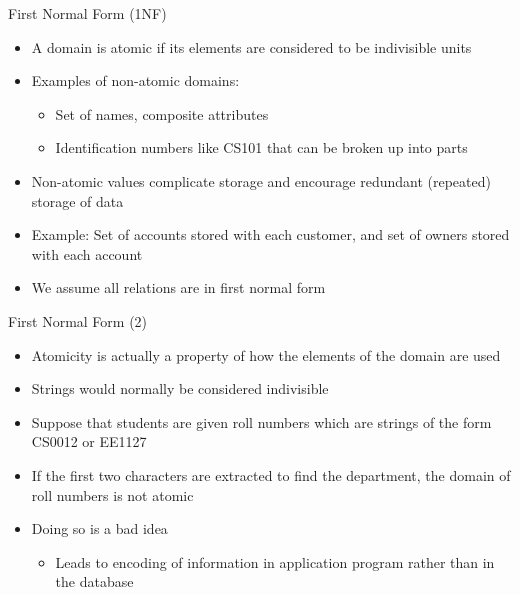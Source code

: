 \documentclass[aspectratio=169, xcolor=dvipsnames]{beamer}
\begin{document}
\begin{frame}{First Normal Form (1NF)}
    \begin{itemize}[<+->]
        \item A domain is atomic if its elements are considered to be indivisible units
        \item Examples of non-atomic domains:
        \begin{itemize}
            \item[$\triangleright$] Set of names, composite attributes
            \item[$\triangleright$] Identification numbers like CS101 that can be broken up into parts
        \end{itemize}
    \end{itemize}
    \begin{itemize}[<+(4)->]
        \item Non-atomic values complicate storage and encourage redundant (repeated) storage of data
        \item Example: Set of accounts stored with each customer, and set of owners stored with each account
        \item We assume all relations are in first normal form
    \end{itemize}
\end{frame}

\begin{frame}{First Normal Form (2)}
    \begin{itemize}[<+->]
        \item Atomicity is actually a property of how the elements of the domain are used
        \item Strings would normally be considered indivisible
        \item Suppose that students are given roll numbers which are strings of the form CS0012 or EE1127
        \item If the first two characters are extracted to find the department, the domain of roll numbers is not atomic
        \item Doing so is a bad idea
        \begin{itemize}
            \item[$\triangleright$] Leads to encoding of information in application program rather than in the database
        \end{itemize}
    \end{itemize}
\end{frame}
\end{document}
